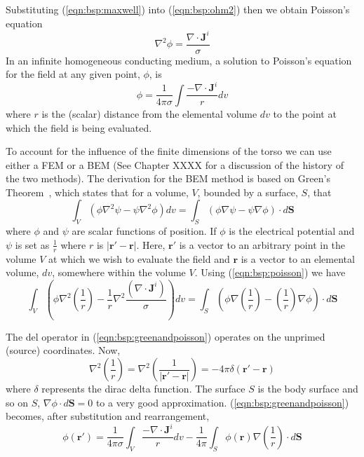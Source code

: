 Substituting (\ref{eqn:bsp:maxwell}) into (\ref{eqn:bsp:ohm2}) then we obtain
Poisson's equation
\begin{equation}
\label{eqn:bsp:poisson}
\nabla^{2}\phi = \frac{\nabla \cdot \mathbf{J}^{i}}{\sigma}
\end{equation}
In an infinite homogeneous conducting medium, a solution to Poisson's equation
for the field at any given point, $\phi$, is~\cite{Plonsey1963}
\begin{equation}
\label{eqn:bsp:infinite}
\phi = \frac{1}{4 \pi \sigma} \int \frac{- \nabla \cdot
\mathbf{J}^{i} }{r} dv
\end{equation}
where $r$ is the (scalar) distance from the elemental volume $dv$ to the point at
which the field is being evaluated.

To account for the influence of the finite dimensions of the torso we can use
either a FEM or a BEM (See Chapter XXXX for a discussion
of the history of the two methods).
The derivation for the BEM method is based on Green's
Theorem~\cite{Barr1966,Gulrajani1989,Clayton2002},
which states that for a volume, $V$, bounded by a surface, $S$, that
\begin{equation}
\label{eqn:bsp:green}
\int_{V} \left(\phi \nabla^{2}\psi - \psi \nabla^{2}\phi  \right) dv =
\int_{S} \left( \phi \nabla \psi - \psi \nabla \phi \right) \cdot d\mathbf{S}
\end{equation}
where $\phi$ and $\psi$ are scalar functions of position.
If $\phi$ is the electrical potential and $\psi$ is set as $\frac{1}{r}$ where
$r$ is $|\mathbf{r'}-\mathbf{r}|$.
Here, $\mathbf{r'}$ is a vector to an arbitrary point in the volume $V$ at which
we wish to evaluate the field and $\mathbf{r}$ is a vector to an elemental
volume, $dv$, somewhere within the volume $V$.
Using (\ref{eqn:bsp:poisson}) we have
\begin{equation}
\label{eqn:bsp:greenandpoisson}
\int_{V}
    \left(
        \phi \nabla^{2}\left(\frac{1}{r}\right) -
        \frac{1}{r} \nabla^{2}\frac{\left(\nabla \cdot \mathbf{J}^{i} \right)}{\sigma}
    \right)
dv =
\int_{S}
    \left(
        \phi \nabla \left(\frac{1}{r}\right) -
        \left(\frac{1}{r}\right) \nabla \phi
    \right)
\cdot d\mathbf{S}
\end{equation}

The del operator in (\ref{eqn:bsp:greenandpoisson}) operates on the unprimed (source) coordinates.
Now,
\begin{equation}
\label{eqn:bsp:oneoverr}
\nabla^{2}\left(\frac{1}{r}\right) =
\nabla^{2}\left(\frac{1}{|\mathbf{r'}-\mathbf{r}|}\right) =
-4\pi\delta\left(\mathbf{r'}-\mathbf{r}\right)
\end{equation}
where $\delta$ represents the dirac delta function.  The surface $S$ is the body
surface and so on $S$, $\nabla\phi \cdot d\mathbf{S} = 0$ to a very good
approximation.  (\ref{eqn:bsp:greenandpoisson}) becomes, after substitution and
rearrangement,
\begin{equation}
\label{eqn:bsp:substituted}
\phi\left(\mathbf{r'}\right) =
\frac{1}{4 \pi \sigma}\int_{V} \frac{-\nabla \cdot \mathbf{J}^{i}}{r}dv - 
\frac{1}{4 \pi}\int_{S} \phi\left(\mathbf{r}\right)
\nabla\left(\frac{1}{r}\right) \cdot d\mathbf{S}
\end{equation}

